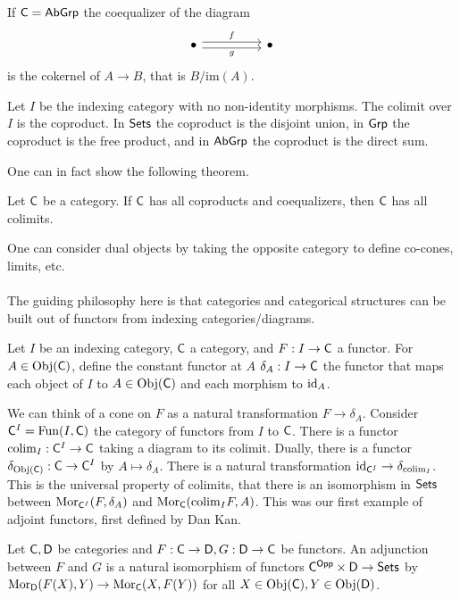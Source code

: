 \begin{example}
  If $\mathsf{C}=\mathsf{AbGrp}$ the coequalizer of the diagram 
  $$%
  \begin{tikzcd}
    \bullet && \bullet
    \arrow["f", shift left, from=1-1, to=1-3]
    \arrow["g"', shift right, from=1-1, to=1-3]
  \end{tikzcd}$$
  is the cokernel of $A\to B$, that is $B/\mathrm{im}(A)$. 
\end{example}
\begin{example}
  Let $I$ be the indexing category with no non-identity morphisms. The colimit over $I$ is the coproduct. In $\mathsf{Sets}$ the coproduct is the disjoint union, in $\mathsf{Grp}$ the coproduct is the free product, and in $\mathsf{AbGrp}$ the coproduct is the direct sum. 
\end{example}
One can in fact show the following theorem. 
\begin{theorem}
  Let $\mathsf{C}$ be a category. If $\mathsf{C}$ has all coproducts and coequalizers, then $\mathsf{C}$ has all colimits. 
\end{theorem}
One can consider dual objects by taking the opposite category to define co-cones, limits, etc. \\\\
The guiding philosophy here is that categories and categorical structures can be built out of functors from indexing categories/diagrams. 
\begin{definition}
  Let $I$ be an indexing category, $\mathsf{C}$ a category, and $F:I\to\mathsf{C}$ a functor. For $A\in\mathrm{Obj}(\mathsf{C})$, define the constant functor at $A$ $\delta_{A}:I\to\mathsf{C}$ the functor that maps each object of $I$ to $A\in\mathrm{Obj}(\mathsf{C})$ and each morphism to $\mathrm{id}_{A}$. 
\end{definition} 
We can think of a cone on $F$ as a natural transformation $F\to\delta_{A}$. Consider $\mathsf{C}^{I}=\mathrm{Fun}(I,\mathsf{C})$ the category of functors from $I$ to $\mathsf{C}$. There is a functor $\mathrm{colim}_{I}:\mathsf{C}^{I}\to\mathsf{C}$ taking a diagram to its colimit. Dually, there is a functor $\delta_{\mathrm{Obj}(\mathsf{C})}:\mathsf{C}\to\mathsf{C}^{I}$ by $A\mapsto\delta_{A}$. There is a natural transformation $\mathrm{id}_{\mathsf{C}^{I}}\to\delta_{\mathrm{colim}_{I}}$. This is the universal property of colimits, that there is an isomorphism in $\mathsf{Sets}$ between $\mathrm{Mor}_{\mathsf{C}^{I}}(F,\delta_{A})$ and $\mathrm{Mor}_{\mathsf{C}}(\mathrm{colim}_{I}F, A)$. This was our first example of adjoint functors, first defined by Dan Kan. 
\begin{definition}[Adjunction]
  Let $\mathsf{C},\mathsf{D}$ be categories and $F:\mathsf{C}\to\mathsf{D},G:\mathsf{D}\to\mathsf{C}$ be functors. An adjunction between $F$ and $G$ is a natural isomorphism of functors $\mathsf{C}^{\mathsf{Opp}}\times\mathsf{D}\to\mathsf{Sets}$ by $\mathrm{Mor}_{\mathsf{D}}(F(X),Y)\to\mathrm{Mor}_{\mathsf{C}}(X,F(Y))$ for all $X\in\mathrm{Obj}(\mathsf{C}), Y\in\mathrm{Obj}(\mathsf{D})$. 
\end{definition}
